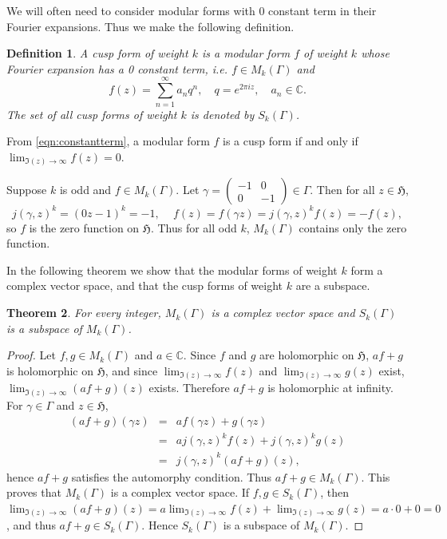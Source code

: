 \documentclass{article}
\newtheorem{theorem}{Theorem}
\newtheorem{definition}[theorem]{Definition}
\begin{document}
We will often need to consider modular forms with
$0$ constant term in their Fourier expansions.
Thus we make the following definition.

\begin{definition}
A {\em cusp form of weight $k$} is a modular form $f$ of weight $k$
whose Fourier expansion has a 0 constant term, i.e. $f \in M_k(\Gamma)$ and
\[
f(z)=\sum_{n=1}^\infty a_n q^n, \quad q=e^{2\pi iz}, \quad a_n \in \mathbb{C}.
\]
The set of all cusp forms of weight $k$ is denoted by $S_k(\Gamma)$. 
\end{definition}

From \eqref{eqn:constantterm}, a modular form $f$ is a cusp form if and only if $\lim_{\Im(z) \to \infty}f(z)=0$.

Suppose $k$ is odd and $f \in M_k(\Gamma)$. Let $\gamma=\begin{pmatrix}-1&0\\0&-1\end{pmatrix} \in \Gamma$. Then for all $z \in \mathfrak{H}$, 
\[
j(\gamma,z)^k=(0z-1)^k=-1,\, \quad f(z)=f(\gamma z)=j(\gamma,z)^k f(z)=-f(z),
\]
so $f$ is the zero function on $\mathfrak{H}$. Thus for all odd $k$, $M_k(\Gamma)$ contains only the zero function. 

In the following theorem we show that the modular forms of weight $k$ form a complex vector space, and that the cusp forms of weight $k$ are a subspace.

\begin{theorem}
For every integer,
$M_k(\Gamma)$ is a complex vector space and
$S_k(\Gamma)$ is a subspace of $M_k(\Gamma)$.
\end{theorem}
\begin{proof}
Let $f,g \in M_k(\Gamma)$ and $a \in \mathbb{C}$. Since $f$ and $g$ are holomorphic on $\mathfrak{H}$, $af+g$ is holomorphic on $\mathfrak{H}$, and since $\lim_{\Im(z) \to \infty} f(z)$ and $\lim_{\Im(z) \to \infty} g(z)$ exist, $\lim_{\Im(z) \to \infty} (af+g)(z)$ exists. Therefore $af+g$ is holomorphic at infinity. For $\gamma \in \Gamma$ and $z \in \mathfrak{H}$,
\begin{eqnarray*}
(af+g)(\gamma z)&=&af(\gamma z)+g(\gamma z)\\
&=&aj(\gamma,z)^k f(z)+j(\gamma,z)^k g(z)\\
&=&j(\gamma,z)^k(af+g)(z),
\end{eqnarray*}
hence $af+g$ satisfies the automorphy condition. Thus $af+g \in M_k(\Gamma)$. This proves that $M_k(\Gamma)$ is a complex vector space. If $f,g \in S_k(\Gamma)$, then $\lim_{\Im(z) \to \infty}(af+g)(z)=a\lim_{\Im(z) \to \infty} f(z)+\lim_{\Im(z) \to \infty} g(z)=a\cdot 0+0=0$, and thus $af+g \in S_k(\Gamma)$. Hence $S_k(\Gamma)$ is a subspace of $M_k(\Gamma)$.
\end{proof}
\end{document}
